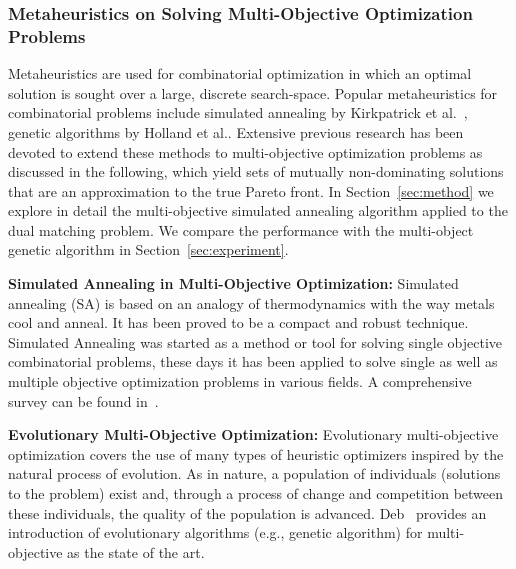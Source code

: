 \subsubsection{Metaheuristics on Solving Multi-Objective Optimization Problems}
Metaheuristics are used for combinatorial optimization in which an optimal solution is sought over a large, discrete search-space. Popular metaheuristics for combinatorial problems include simulated annealing by Kirkpatrick et al.~\cite{Kirkpatrick1987}, genetic algorithms by Holland et al.\cite{Holland1992}. Extensive previous research has been devoted to extend these methods to multi-objective optimization problems as discussed in the following, which yield sets of mutually non-dominating solutions that are an approximation to the true Pareto front. In Section~\ref{sec:method} we explore in detail the multi-objective simulated annealing algorithm applied to the dual matching problem. We compare the performance with the multi-object genetic algorithm in Section~\ref{sec:experiment}.

\textbf{Simulated Annealing in Multi-Objective Optimization:} Simulated annealing (SA) is based on an analogy of thermodynamics with the way metals cool and anneal. It has been proved to be a compact and robust technique. Simulated Annealing was started as a method or tool for solving single objective combinatorial problems, these days it has been applied to solve single as well as multiple objective optimization problems in various fields. A comprehensive survey can be found in~\cite{SumanSurvey}.

\textbf{Evolutionary Multi-Objective Optimization:} Evolutionary multi-objective optimization covers the use of many types of heuristic optimizers inspired by the natural process of evolution. As in nature, a population of individuals (solutions to the problem) exist and, through a process of change and competition between these individuals, the quality of the population is advanced. Deb~\cite{Deb2001} provides an introduction of evolutionary algorithms (e.g., genetic algorithm) for multi-objective as the state of the art.

